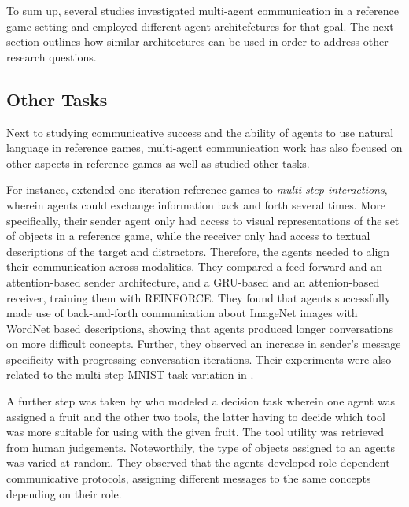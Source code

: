 To sum up, several studies investigated multi-agent communication in a reference game setting and employed different agent architefctures for that goal. The next section outlines how similar architectures can be used in order to address other research questions.

\subsection{Other Tasks}

Next to studying communicative success and the ability of agents to use natural language in reference games, multi-agent communication work has also focused on other aspects in reference games as well as studied other tasks.
 
For instance, \cite{evtimova2017emergent} extended one-iteration reference games to \textit{multi-step interactions}, wherein agents could exchange information back and forth several times. More specifically, their sender agent only had access to visual representations of the set of objects in a reference game, while the receiver only had access to textual descriptions of the target and distractors. Therefore, the agents needed to align their communication across modalities. They compared a feed-forward and an attention-based sender architecture, and a GRU-based and an attenion-based receiver, training them with REINFORCE. They found that agents successfully made use of back-and-forth communication about ImageNet images with WordNet based descriptions, showing that agents produced longer conversations on more difficult concepts. Further, they observed an increase in sender's message specificity with progressing conversation iterations.
Their experiments were also related to the multi-step MNIST task variation in \cite{foerster2016learning}.

A further step was taken by \cite{bouchacourt2019miss} who modeled a decision task wherein one agent was assigned a fruit and the other two tools, the latter having to decide which tool was more suitable for using with the given fruit. The tool utility was retrieved from human judgements. Noteworthily, the type of objects assigned to an agents was varied at random. They observed that the agents developed role-dependent communicative protocols, assigning different messages to the same concepts depending on their role. 

